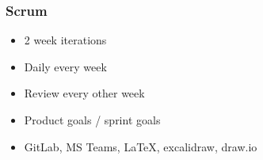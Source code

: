 \begin{frame}
    \frametitle{Scrum}
    \begin{itemize}
        \large
        \item 2 week iterations
        \item Daily every week
        \item Review every other week
        \item Product goals / sprint goals
        \item GitLab, MS Teams, LaTeX, excalidraw, draw.io
    \end{itemize}
\end{frame}